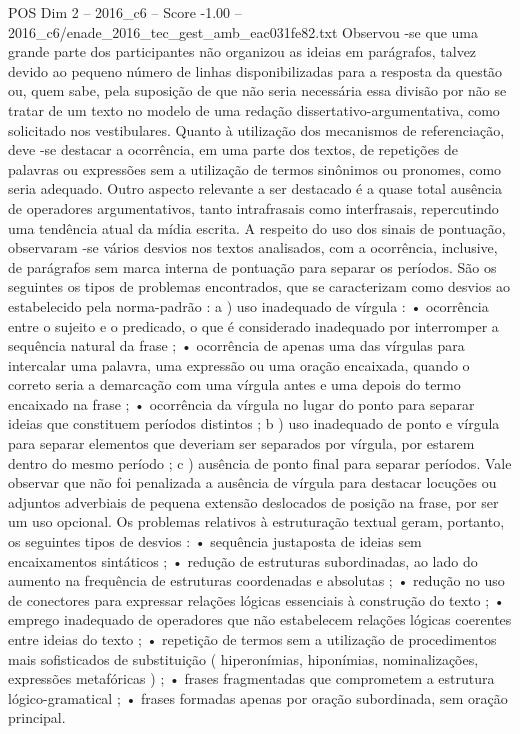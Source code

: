 \begin{textsample}{POS Dim 2 – 2016\_c6 – Score -1.00 – 2016\_c6/enade\_2016\_tec\_gest\_amb\_eac031fe82.txt}
Observou -se que uma grande parte dos participantes não organizou as ideias em parágrafos, talvez devido ao pequeno número de linhas disponibilizadas para a resposta da questão ou, quem sabe, pela suposição de que não seria necessária essa divisão por não se tratar de um texto no modelo de uma redação dissertativo-argumentativa, como solicitado nos vestibulares.
Quanto à utilização dos mecanismos de referenciação, deve -se destacar a ocorrência, em uma parte dos textos, de repetições de palavras ou expressões sem a utilização de termos sinônimos ou pronomes, como seria adequado.
Outro aspecto relevante a ser destacado é a quase total ausência de operadores argumentativos, tanto intrafrasais como interfrasais, repercutindo uma tendência atual da mídia escrita.
A respeito do uso dos sinais de pontuação, observaram -se vários desvios nos textos analisados, com a ocorrência, inclusive, de parágrafos sem marca interna de pontuação para separar os períodos.
São os seguintes os tipos de problemas encontrados, que se caracterizam como desvios ao estabelecido pela norma-padrão : a ) uso inadequado de vírgula : • ocorrência entre o sujeito e o predicado, o que é considerado inadequado por interromper a sequência natural da frase ; • ocorrência de apenas uma das vírgulas para intercalar uma palavra, uma expressão ou uma oração encaixada, quando o correto seria a demarcação com uma vírgula antes e uma depois do termo encaixado na frase ; • ocorrência da vírgula no lugar do ponto para separar ideias que constituem períodos distintos ; b ) uso inadequado de ponto e vírgula para separar elementos que deveriam ser separados por vírgula, por estarem dentro do mesmo período ; c ) ausência de ponto final para separar períodos.
Vale observar que não foi penalizada a ausência de vírgula para destacar locuções ou adjuntos adverbiais de pequena extensão deslocados de posição na frase, por ser um uso opcional.
Os problemas relativos à estruturação textual geram, portanto, os seguintes tipos de desvios : • sequência justaposta de ideias sem encaixamentos sintáticos ; • redução de estruturas subordinadas, ao lado do aumento na frequência de estruturas coordenadas e absolutas ; • redução no uso de conectores para expressar relações lógicas essenciais à construção do texto ; • emprego inadequado de operadores que não estabelecem relações lógicas coerentes entre ideias do texto ; • repetição de termos sem a utilização de procedimentos mais sofisticados de substituição ( hiperonímias, hiponímias, nominalizações, expressões metafóricas ) ; • frases fragmentadas que comprometem a estrutura lógico-gramatical ; • frases formadas apenas por oração subordinada, sem oração principal.

\end{textsample}
